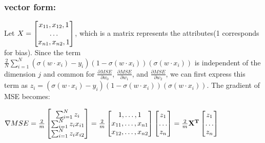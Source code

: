 \documentclass[12pt]{article}
\begin{document}
\subsubsection*{vector form: }
Let $X = \left[\begin{array}{@{}c@{}}
        x_{11}, x_{12}, 1 \\
        \dots \\
        x_{n1}, x_{n2}, 1
         \end{array} \right]$, which is a matrix represents the attributes(1 corresponds for bias).
Since the term $\frac{2}{N}\sum_{i=1}^{N}(\sigma(w \cdot x_i)-y_i)(1-\sigma(w \cdot x_i))(\sigma(w\cdot x_i))$ is independent of the dimension
$j$ and common for $\frac{\partial MSE}{\partial w_0}$, $\frac{\partial MSE}{\partial w_1}$, and $\frac{\partial MSE}{\partial w_2}$, we can first express 
this term as $z_i = (\sigma(w \cdot x_i)-y_i)(1-\sigma(w \cdot x_i))(\sigma(w\cdot x_i))$. The gradient of MSE becomes: 
\begin{center}
    $\nabla MSE = \frac{2}{m} \left[\begin{array}{@{}c@{}}
                \sum_{i=1}^{N} z_i \\
                \sum_{i=1}^{N} z_{i}x_{i1} \\
                \sum_{i=1}^{N} z_{i}x_{i2}
                \end{array} \right] = \frac{2}{m}\left[\begin{array}{@{}c@{}}
                                     1, \dots, 1 \\
                                     x_{11}, \dots, x_{n1} \\
                                     x_{12}, \dots, x_{n2}
                                     \end{array} \right] \left[\begin{array}{@{}c@{}}
                                                         z_1 \\
                                                         \dots \\
                                                         z_n
                                                         \end{array}\right] = \frac{2}{m}\mathbf{X^{T}}\left[\begin{array}{@{}c@{}}
                                                            z_1 \\
                                                            \dots \\
                                                            z_n
                                                            \end{array}\right] $
\end{center}
\end{document}
